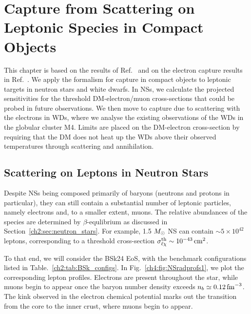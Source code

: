 \graphicspath{{img/capture_leptons/}}

\chapter{Capture from Scattering on Leptonic Species in Compact Objects}
\label{chapter:capture_leptons}

\begin{synopsis}
This chapter is based on the results of Ref.~\cite{Bell:2020lmm_mar_ImprovedTreatmentDark} and on the electron capture results in Ref.~\cite{Bell:2021fye_oct_Improvedtreatmentdark}. We apply the formalism for capture in compact objects to leptonic targets in neutron stars and white dwarfs. In NSs, we calculate the projected sensitivities for the threshold DM-electron/muon cross-sections that could be probed in future observations. We then move to capture due to scattering with the electrons in WDs, where we analyse the existing observations of the WDs in the globular cluster M4. Limits are placed on the DM-electron cross-section by requiring that the DM does not heat up the WDs above their observed temperatures through scattering and annihilation.
\end{synopsis}




\section{Scattering on Leptons in Neutron Stars}
\label{ch4:sec:lep_NS}
Despite NSs being composed primarily of baryons (neutrons and protons in particular), they can still contain a substantial number of leptonic particles, namely electrons and, to a smaller extent, muons. The relative abundances of the species are determined by $\beta$-equlibrium as discussed in Section~\ref{ch2:sec:neutron_stars}. For example, 1.5 $M_\odot$ NS can contain $\sim 5\times 10^{42}$ leptons, corresponding to a threshold cross-section $\sigma^{\rm th}_{\ell\chi}\sim 10^{-43}{\rm \,cm}^2$.

To that end, we will consider the BSk24 EoS, with the benchmark configurations listed in Table.~\ref{ch2:tab:BSk_configs}.
In Fig.~\ref{ch4:fig:NSradprofs1}, we plot the corresponding lepton profiles.
Electrons are present throughout the star, while muons begin to appear once the baryon number density exceeds $n_b\simeq 0.12{\rm \,fm}^{-3}$. The kink observed in the electron chemical potential marks out the transition from the core to the inner crust, where muons begin to appear. 

